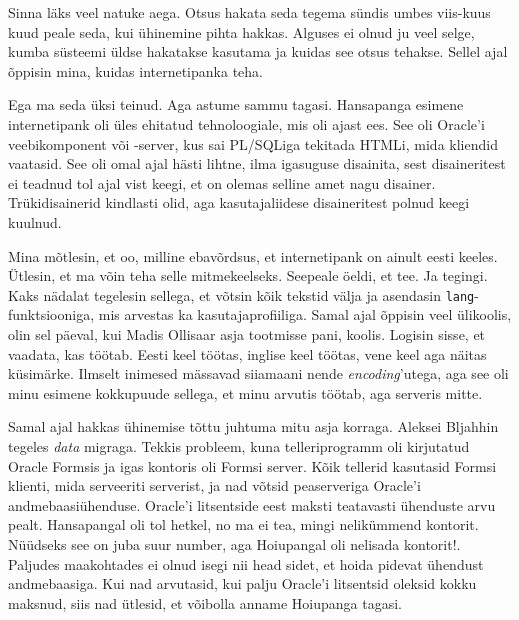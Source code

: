 Sinna läks veel natuke aega. Otsus hakata seda tegema sündis 
umbes viis-kuus kuud peale seda, kui ühinemine pihta hakkas. Alguses  
ei olnud ju veel selge, kumba süsteemi üldse hakatakse kasutama ja kuidas see 
otsus tehakse. Sellel ajal õppisin mina, kuidas internetipanka teha.


Ega ma seda üksi teinud. Aga astume sammu tagasi. Hansapanga esimene 
internetipank oli üles ehitatud tehnoloogiale, mis oli ajast ees. See 
oli Oracle'i veebikomponent või -server, kus 
sai PL/SQLiga tekitada HTMLi, mida kliendid 
vaatasid. See oli omal ajal hästi lihtne, ilma igasuguse disainita, sest 
disaineritest ei teadnud tol ajal vist keegi, et on olemas selline amet nagu disainer. 
Trükidisainerid kindlasti olid, aga kasutajaliidese disaineritest polnud keegi kuulnud. 

Mina mõtlesin, et oo, milline 
ebavõrdsus, et internetipank on ainult eesti keeles. Ütlesin, et ma võin teha selle 
mitmekeelseks. Seepeale öeldi, et tee. Ja tegingi. Kaks nädalat tegelesin 
sellega, et võtsin kõik tekstid välja ja asendasin \verb|lang|-funktsiooniga, mis 
arvestas ka kasutajaprofiiliga. Samal ajal õppisin veel ülikoolis, olin sel
päeval, kui Madis Ollisaar asja tootmisse pani, koolis. 
Logisin sisse, et vaadata, kas töötab. Eesti keel töötas, inglise keel 
töötas, vene keel aga näitas küsimärke. Ilmselt inimesed mässavad siiamaani nende 
\emph{encoding}'utega, aga see oli minu esimene kokkupuude sellega, et minu 
arvutis töötab, aga serveris mitte.

Samal ajal hakkas ühinemise tõttu juhtuma mitu asja korraga.  
Aleksei Bljahhin tegeles \emph{data} migraga. 
Tekkis probleem, kuna telleri{\-}programm oli kirjutatud Oracle Formsis ja igas 
kontoris oli Formsi server. Kõik tellerid kasutasid Formsi klienti, mida 
serveeriti serverist, ja nad võtsid peaserveriga Oracle'i 
andmebaasiühenduse. Oracle'i litsentside eest maksti teatavasti ühenduste arvu 
pealt. Hansapangal oli tol hetkel, no ma ei tea, mingi nelikümmend 
kontorit. Nüüdseks see on juba suur number, aga Hoiupangal oli nelisada 
kontorit!. Paljudes maakohtades ei olnud isegi nii head sidet, et 
hoida pidevat ühendust andmebaasiga. Kui nad arvutasid, kui palju 
Oracle'i litsentsid oleksid kokku maksnud, siis nad ütlesid, et võibolla anname 
Hoiupanga tagasi. 

